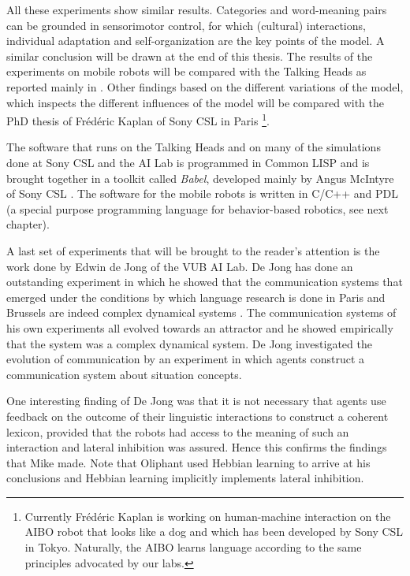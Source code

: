 
All these experiments show similar results. Categories and word-meaning pairs can be grounded in sensorimotor control, for which (cultural) interactions, individual adaptation and self-organization are the key points of the model. A similar conclusion will be drawn at the end of this thesis. The results of the experiments on mobile robots will be compared with the Talking Heads as reported mainly in \cite{steels:2000}. Other findings based on the different variations of the model, which inspects the different influences of the model will be compared with the PhD thesis of Fr\'ed\'eric Kaplan of Sony CSL in Paris \cite{kaplan:2000}\footnote{Currently Fr\'ed\'eric Kaplan is working on human-machine interaction on the AIBO robot that looks like a dog and which has been developed by Sony CSL in Tokyo. Naturally, the AIBO learns language according to the same principles advocated by our labs.}.

The software that runs on the Talking Heads and on many of the simulations done at Sony CSL and the AI Lab is programmed in Common LISP and is brought together in a toolkit called {\em Babel}, developed mainly by Angus McIntyre of Sony CSL \cite{mcintyre:1998}. The software for the mobile robots is written in C/C++ and PDL (a special purpose programming language for behavior-based robotics, see next chapter).

\p
A last set of experiments that will be brought to the reader's attention is the work done by Edwin de Jong of the VUB AI Lab. De Jong has done an outstanding experiment in which he showed that the communication systems that emerged under the conditions by which language research is done in Paris and Brussels are indeed complex dynamical systems \cite{dejong:2000}. The communication systems of his own experiments all evolved towards an attractor and he showed empirically that the system was a complex dynamical system. De Jong investigated the evolution of communication by an experiment in which agents construct a communication system about situation concepts.

One interesting finding of De Jong was that it is not necessary that agents use feedback on the outcome of their linguistic interactions to construct a coherent lexicon, provided that the robots had access to the meaning of such an interaction and lateral inhibition was assured. Hence this confirms the findings that Mike  made. Note that Oliphant used Hebbian learning to arrive at his conclusions and Hebbian learning implicitly implements lateral inhibition.

